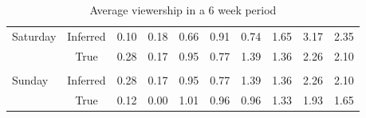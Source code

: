 \begin{table}[H]
\begin{tabular}{lccccccccc}
\multicolumn{1}{l|}{\multirow{2}{*}{Saturday}}  & \multicolumn{1}{c|}{Inferred} & \multicolumn{1}{c|}{0.10}           & \multicolumn{1}{c|}{0.18}           & \multicolumn{1}{c|}{0.66}           & \multicolumn{1}{c|}{0.91}           & \multicolumn{1}{c|}{0.74}           & \multicolumn{1}{c|}{1.65}           & \multicolumn{1}{c|}{3.17}           & \multicolumn{1}{c|}{2.35}           \\ \cline{2-10} 
\multicolumn{1}{l|}{}                           & \multicolumn{1}{c|}{True}     & \multicolumn{1}{c|}{0.28}           & \multicolumn{1}{c|}{0.17}           & \multicolumn{1}{c|}{0.95}           & \multicolumn{1}{c|}{0.77}           & \multicolumn{1}{c|}{1.39}           & \multicolumn{1}{c|}{1.36}           & \multicolumn{1}{c|}{2.26}           & \multicolumn{1}{c|}{2.10}           \\ \cline{2-10} 
                                                &                               &                                     &                                     &                                     &                                     &                                     &                                     &                                     &                                     \\ \cline{2-10} 
\multicolumn{1}{l|}{\multirow{2}{*}{Sunday}}    & \multicolumn{1}{c|}{Inferred} & \multicolumn{1}{c|}{0.28}           & \multicolumn{1}{c|}{0.17}           & \multicolumn{1}{c|}{0.95}           & \multicolumn{1}{c|}{0.77}           & \multicolumn{1}{c|}{1.39}           & \multicolumn{1}{c|}{1.36}           & \multicolumn{1}{c|}{2.26}           & \multicolumn{1}{c|}{2.10}           \\ \cline{2-10} 
\multicolumn{1}{l|}{}                           & \multicolumn{1}{c|}{True}     & \multicolumn{1}{c|}{0.12}           & \multicolumn{1}{c|}{0.00}           & \multicolumn{1}{c|}{1.01}           & \multicolumn{1}{c|}{0.96}           & \multicolumn{1}{c|}{0.96}           & \multicolumn{1}{c|}{1.33}           & \multicolumn{1}{c|}{1.93}           & \multicolumn{1}{c|}{1.65}           \\ \cline{2-10} 
\end{tabular}
\caption{Average viewership in a 6 week period}
\label{tab:CaseRes}
\end{table}